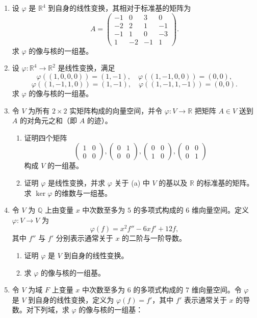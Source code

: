 \begin{enumerate}[label=\arabic*.,resume]
\item 设 $\varphi$ 是 $\mathbb R^4$ 到自身的线性变换，其相对于标准基的矩阵为
\[
A=\begin{pmatrix}
-1&0&3&0\\
-2&2&1&-1\\
-1&1&0&-3\\
1&-2&-1&1
\end{pmatrix}.
\]
求 $\varphi$ 的像与核的一组基。
\item 设 $\varphi:\mathbb R^4\to\mathbb R^2$ 是线性变换，满足
\[
\varphi((1,0,0,0))=(1,-1),
\quad \varphi((1,-1,0,0))=(0,0),
\]
\[
\varphi((1,-1,1,0))=(1,-1),
\quad \varphi((1,-1,1,-1))=(0,0).
\]
求 $\varphi$ 的像与核的一组基。
\item 令 $V$ 为所有 $2\times2$ 实矩阵构成的向量空间，并令 $\varphi:V\to\mathbb R$ 把矩阵 $A\in V$ 送到 $A$ 的对角元之和（即 $A$ 的迹）。
\begin{enumerate}[label=(\alph*)]
\item 证明四个矩阵
\[
\begin{pmatrix}1&0\\0&0\end{pmatrix},
\begin{pmatrix}0&1\\0&0\end{pmatrix},
\begin{pmatrix}0&0\\1&0\end{pmatrix},
\begin{pmatrix}0&0\\0&1\end{pmatrix}
\]
构成 $V$ 的一组基。
\item 证明 $\varphi$ 是线性变换，并求 $\varphi$ 关于 (a) 中 $V$ 的基以及 $\mathbb R$ 的标准基的矩阵。求 $\ker\varphi$ 的维数与一组基。
\end{enumerate}
\item 令 $V$ 为 $\mathbb Q$ 上由变量 $x$ 中次数至多为 $5$ 的多项式构成的 $6$ 维向量空间。定义 $\varphi:V\to V$ 为
\[
\varphi(f)=x^2f''-6xf'+12f,
\]
其中 $f''$ 与 $f'$ 分别表示通常关于 $x$ 的二阶与一阶导数。
\begin{enumerate}[label=(\alph*)]
\item 证明 $\varphi$ 是 $V$ 到自身的线性变换。
\item 求 $\varphi$ 的像与核的一组基。
\end{enumerate}
\item 令 $V$ 为域 $F$ 上变量 $x$ 中次数至多为 $6$ 的多项式构成的 $7$ 维向量空间。令 $\varphi$ 是 $V$ 到自身的线性变换，定义为 $\varphi(f)=f'$，其中 $f'$ 表示通常关于 $x$ 的导数。对下列域，求 $\varphi$ 的像与核的一组基：

\end{enumerate}
